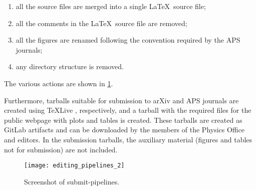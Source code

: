 \begin{enumerate}
\item all the source files are merged into a single \LaTeX\ source file;
\item all the comments in the \LaTeX\ source file are removed;
\item all the figures are renamed following the convention required by the APS journals;
\item any directory structure is removed.
\end{enumerate}
The various actions are shown in \cref{fig:submit-pipelines}.

Furthermore, tarballs suitable for submission to arXiv and APS journals are created using \TeX{}Live , respectively, and a tarball with the required files for the public webpage with plots and tables is created. These tarballs are created as GitLab artifacts and can be downloaded by the members of the Physics Office and editors. In the submission tarballs, the auxiliary material (figures and tables not for submission) are not included.

\begin{figure}[htb]
  \centering
  \texttt{[image: editing\_pipelines\_2]}
  \caption{Screenshot of submit-pipelines.
    }%
  \label{fig:submit-pipelines}
\end{figure}


